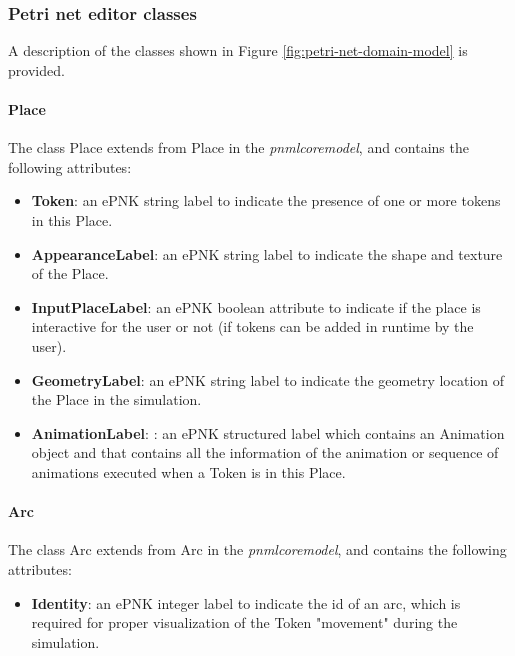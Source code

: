 \subsubsection{Petri net editor classes}

A description of the classes shown in Figure \ref{fig:petri-net-domain-model} is provided.

\paragraph{Place}

The class Place extends from Place in the \textit{pnmlcoremodel}, and contains the following attributes:

\begin{itemize}
	\item \textbf{Token}: an ePNK string label to indicate the presence of one or more tokens in this Place.
	\item \textbf{AppearanceLabel}: an ePNK string label to indicate the shape and texture of the Place.
	\item \textbf{InputPlaceLabel}: an ePNK boolean attribute to indicate if the place is interactive for the user or not (if tokens can be added in runtime by the user).
	\item \textbf{GeometryLabel}: an ePNK string label to indicate the geometry location of the Place in the simulation.
	\item \textbf{AnimationLabel}: : an ePNK structured label which contains an Animation object and that contains all the information of the animation or sequence of animations executed when a Token is in this Place.
\end{itemize}

\paragraph{Arc}

The class Arc extends from Arc in the \textit{pnmlcoremodel}, and contains the following attributes:

\begin{itemize}
	\item \textbf{Identity}: an ePNK integer label to indicate the id of an arc, which is required for proper visualization of the Token "movement" during the simulation.
\end{itemize}